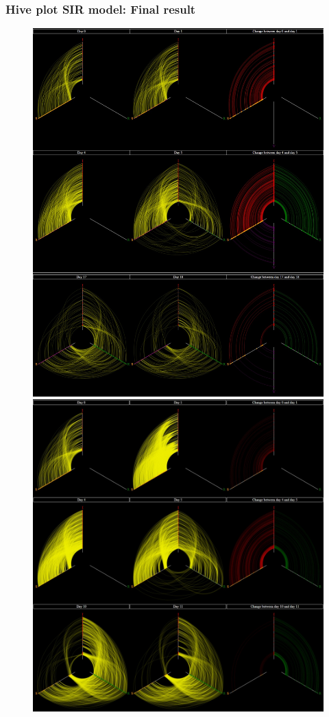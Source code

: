 \documentclass{beamer}
\begin{document}
\begin{frame}
\frametitle{Hive plot SIR model: Final result}
\begin{figure}[H]\label{fig:perc_diff}
\centering	
\includegraphics[scale=0.1]{img/tot_vacc.jpg}
\vspace{10pt}
\includegraphics[scale=0.1185]{img/tot_hive.jpg}

\end{figure}
\end{frame}
\end{document}
